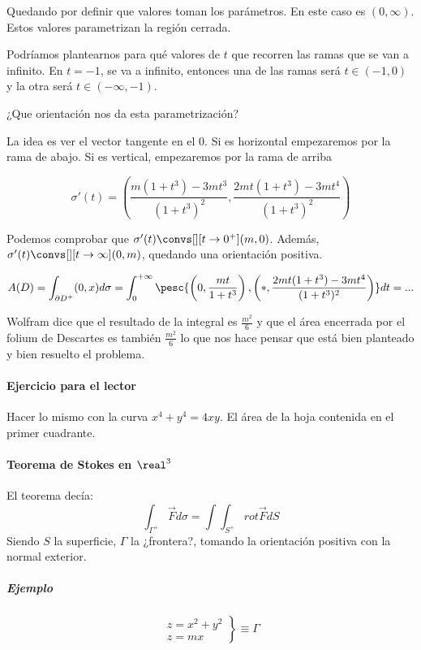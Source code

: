 Quedando por definir que valores toman los parámetros. En este caso es $(0,\infty)$. Estos valores parametrizan la región cerrada. 

Podríamos plantearnos para qué valores de $t$ que recorren las ramas que se van a infinito. En $t=-1$, se va a infinito, entonces una de las ramas será $t\in(-1,0)$ y la otra será $t\in(-\infty,-1)$.

¿Que orientación nos da esta parametrización?

La idea es ver el vector tangente en el 0. Si es horizontal empezaremos por la rama de abajo. Si es vertical, empezaremos por la rama de arriba

\[\sigma'(t) = \left(\frac{m(1+t^3)-3mt^3}{(1+t^3)^2},\frac{2mt(1+t^3) - 3mt^4}{(1+t^3)^2}\right)\]

Podemos comprobar que $\sigma'(t) \convs[][t\to 0^+] (m,0)$. Además, $\sigma'(t) \convs[][t\to\infty](0,m)$, quedando una orientación positiva.

\[
A(D) = \int_{\partial  D^+} (0,x)d\sigma = \int_0^{+\infty} \pesc{\left(0,\frac{mt}{1+t^3}\right), \left(\ast,\frac{2mt(1+t^3)-3mt^4}{(1+t^3)^2}\right)}dt = ...
\]

Wolfram dice que el resultado de la integral es $\frac{m^2}{6}$ y que el área encerrada por el folium de Descartes es también $\frac{m^2}{6}$ lo que nos hace pensar que está bien planteado y bien resuelto el problema.


\paragraph{Ejercicio para el lector} Hacer lo mismo con la curva $x^4+y^4=4xy$. El área de la hoja contenida en el primer cuadrante.

\paragraph{Teorema de Stokes en $\real^3$}

El teorema decía: \[
\int_{\Gamma^+}\overrightarrow{F}d\sigma = \int \int_{S^+} rot\overrightarrow{F} dS
\]
Siendo $S$ la superficie, $\Gamma$ la ¿frontera?, tomando la orientación positiva con la normal exterior.

\subparagraph{Ejemplo}
\[
\left.\begin{array}{cc}
z=x^2+y^2\\
z=mx \end{array} \right\} \equiv \Gamma
\]

